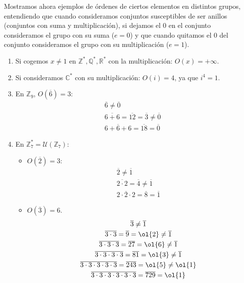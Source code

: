 \begin{ejemplo}
    Mostramos ahora ejemplos de órdenes de ciertos elementos en distintos grupos, entendiendo que cuando consideramos conjuntos susceptibles de ser anillos (conjuntos con suma y multiplicación), si dejamos el $0$ en el conjunto consideramos el grupo con su suma ($e=0$) y que cuando quitamos el $0$ del conjunto consideramos el grupo con su multiplicación ($e=1$).
    \begin{enumerate}
        \item Si cogemos $x\neq 1$ en $\mathbb{Z}^\ast, \mathbb{Q}^\ast, \mathbb{R}^\ast$ con la multiplicación: $O(x)=+\infty$.
        \item Si consideramos $\mathbb{C}^\ast$ con su multiplicación: $O(i)=4$, ya que $i^4 = 1$.
        \item En $\mathbb{Z}_9$, $O\left(\overline{6}\right) = 3$:
            \begin{gather*}
                \overline{6} \neq \overline{0} \\
                \overline{6+6} = \overline{12} = \overline{3} \neq \overline{0} \\
                \overline{6+6+6} = \overline{18} = \overline{0}
            \end{gather*}
        \item En $\mathbb{Z}_{7}^{\ast}= \mathcal{U}(\mathbb{Z}_7):$ 
            \begin{itemize}
                \item $O\left(\overline{2}\right)=3$:
                    \begin{gather*}
                        \overline{2} \neq \overline{1} \\
                        \overline{2\cdot 2} = \overline{4} \neq \overline{1} \\
                        \overline{2\cdot 2\cdot 2} = \overline{8} = \overline{1}
                    \end{gather*}
                \item $O\left(\overline{3}\right)=6$.
                \begin{gather*}
                    \overline{3} \neq \overline{1} \\
                    \overline{3\cdot 3} = \overline{9} = \ol{2} \neq \overline{1} \\
                    \overline{3\cdot 3\cdot 3} = \overline{27} = \ol{6} \neq \overline{1} \\
                    \overline{3\cdot 3\cdot 3\cdot 3} = \overline{81} = \ol{3} \neq \overline{1}\\
                    \overline{3\cdot 3\cdot 3\cdot 3\cdot 3} = \overline{243} = \ol{5} \neq \ol{1}\\
                    \overline{3\cdot 3\cdot 3\cdot 3\cdot 3\cdot 3} = \overline{729} = \ol{1}
                \end{gather*}
            \end{itemize}
    \end{enumerate}
\end{ejemplo}

